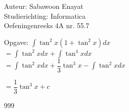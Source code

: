 \documentclass[a4paper]{article}
\begin{document}
  
\noindent \large Auteur: Sabawoon Enayat \\
\noindent \large Studierichting: Informatica\\
\noindent \large Oefeningenreeks 4A nr. 55.7 \\

\newcommand{\dint}{\displaystyle\int}

\medskip

\normalsize

Opgave: $\dint \tan^2 x \left(1 + \tan^2 x\right) dx$\\

$= \dint \tan^2 x dx + \dint \tan^4 x dx$\\

$= \dint \tan^2 x dx + \dfrac{1}{3} \tan^3 x - \dint \tan^2 x dx$

$= \dfrac{1}{3} \tan^3 x + c$\\

\begin{thebibliography}{999}
\end{thebibliography}
\end{document}
